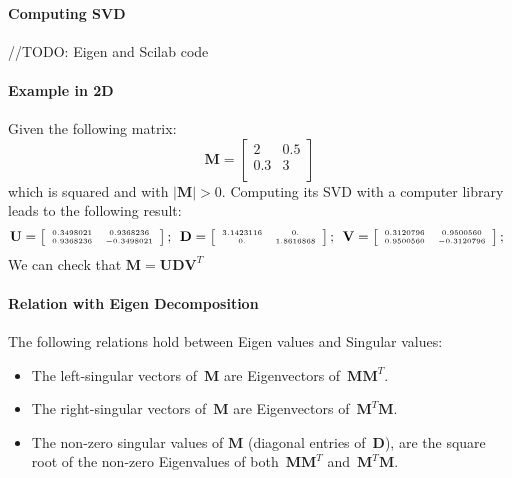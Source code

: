 \paragraph{Computing SVD}
//TODO: Eigen and Scilab code

\paragraph{Example in 2D}
Given the following matrix: 
\begin{equation}
\mathbf{M} = 
\left[
 \begin{array}{cc}
  2 &  0.5 \\
  0.3 &  3 \\
 \end{array}
 \right]
\end{equation}
which is squared and with $|\mathbf{M}|>0$. Computing its SVD with a computer library leads to the following result: 
\begin{equation}
\tiny
\mathbf{U} = 
\left[
 \begin{array}{cc}
    0.3498021   &  0.9368236  \\
    0.9368236  & - 0.3498021 \\
 \end{array}
 \right];\ \ 
\mathbf{D} = 
\left[
 \begin{array}{cc}
    3.1423116   &  0.         \\
    0.          &  1.8616868  \\
 \end{array}
 \right];\ \ 
\mathbf{V} = 
\left[
 \begin{array}{cc}
    0.3120796 &    0.9500560  \\
    0.9500560 &  - 0.3120796  \\
 \end{array}
 \right];\ \ 
\end{equation}
We can check that $\mathbf{M} = \mathbf{U} \mathbf{D} \mathbf{V}^T$

\paragraph{Relation with Eigen Decomposition}
The following relations hold between Eigen values and Singular values:
\begin{itemize}
 \item The left-singular vectors of~$\mathbf{M}$ are Eigenvectors of~$\mathbf{M}\mathbf{M}^T$. 
 \item The right-singular vectors of~$\mathbf{M}$ are Eigenvectors of~$\mathbf{M}^T\mathbf{M}$.
 \item The non-zero singular values of $\mathbf{M}$ (diagonal entries of~$\mathbf{D}$), are the square root of the non-zero Eigenvalues of both~$\mathbf{M}\mathbf{M}^T$ and~$\mathbf{M}^T\mathbf{M}$. 
\end{itemize}


